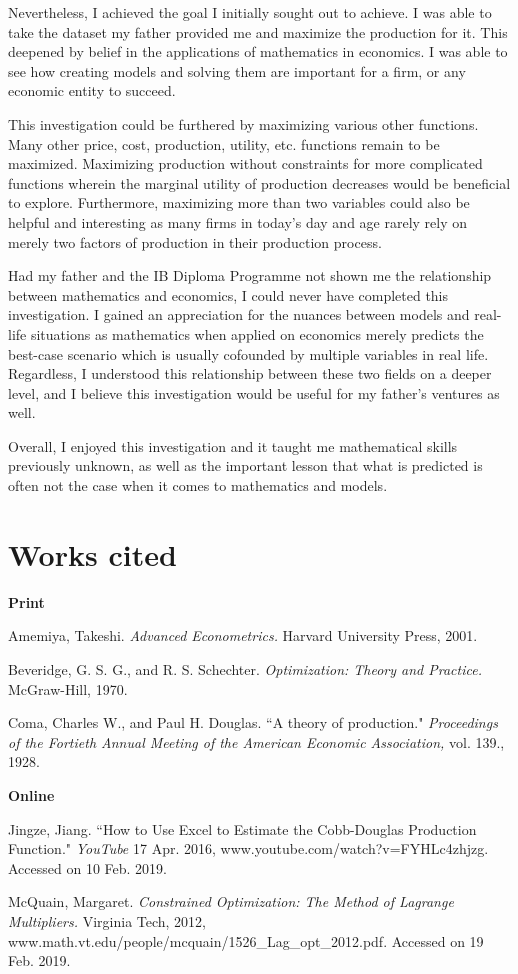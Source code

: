\documentclass[a4paper,12pt]{article}
\theoremstyle{definition}
\begin{document}
Nevertheless, I achieved the goal I initially sought out to achieve. I was able to take the dataset my father provided me and maximize the production for it. This deepened by belief in the applications of mathematics in economics. I was able to see how creating models and solving them are important for a firm, or any economic entity to succeed. 

This investigation could be furthered by maximizing various other functions. Many other price, cost, production, utility, etc. functions remain to be maximized. Maximizing production without constraints for more complicated functions wherein the marginal utility of production decreases would be beneficial to explore. Furthermore, maximizing more than two variables could also be helpful and interesting as many firms in today's day and age rarely rely on merely two factors of production in their production process.

Had my father and the IB Diploma Programme not shown me the relationship between mathematics and economics, I could never have completed this investigation. I gained an appreciation for the nuances between models and real-life situations as mathematics when applied on economics merely predicts the best-case scenario which is usually cofounded by multiple variables in real life. Regardless, I understood this relationship between these two fields on a deeper level, and I believe this investigation would be useful for my father's ventures as well.

Overall, I enjoyed this investigation and it taught me mathematical skills previously unknown, as well as the important lesson that what is predicted is often not the case when it comes to mathematics and models.


\newpage
\section{Works cited}
\singlespacing
\begin{flushleft}
\sloppy
\textbf{\large Print}

Amemiya, Takeshi. \textit{Advanced Econometrics.} Harvard University Press, 2001.

Beveridge, G. S. G., and R. S. Schechter. \textit{Optimization: Theory and Practice.} McGraw-Hill, 1970.

Coma, Charles W., and Paul H. Douglas. ``A theory of production." \textit{Proceedings of the Fortieth Annual Meeting of the American Economic Association,} vol. 139., 1928.

\textbf{\large Online}

Jingze, Jiang. ``How to Use Excel to Estimate the Cobb-Douglas Production Function." \textit{YouTube} 17 Apr. 2016, www.youtube.com/watch?v=FYHLc4zhjzg. Accessed on 10 Feb. 2019.

McQuain, Margaret. \textit{Constrained Optimization: The Method of Lagrange Multipliers.} Virginia Tech, 2012, www.math.vt.edu/people/mcquain/1526\_Lag\_opt\_2012.pdf. Accessed on 19 Feb. 2019.

\end{flushleft}
\end{document}
